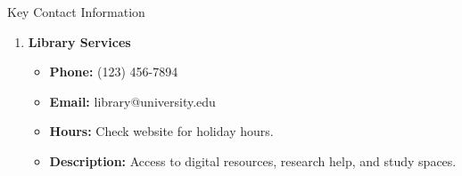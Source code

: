 \documentclass[aspectratio=169]{beamer}
\begin{document}
\begin{frame}[fragile]
\begin{block}{Key Contact Information}
\begin{enumerate}
            \item \textbf{Library Services}
            \begin{itemize}
                \item \textbf{Phone:} (123) 456-7894
                \item \textbf{Email:} library@university.edu
                \item \textbf{Hours:} Check website for holiday hours.
                \item \textbf{Description:} Access to digital resources, research help, and study spaces.
            \end{itemize}
        \end{enumerate}
    \end{block}
\end{frame}
\end{document}

